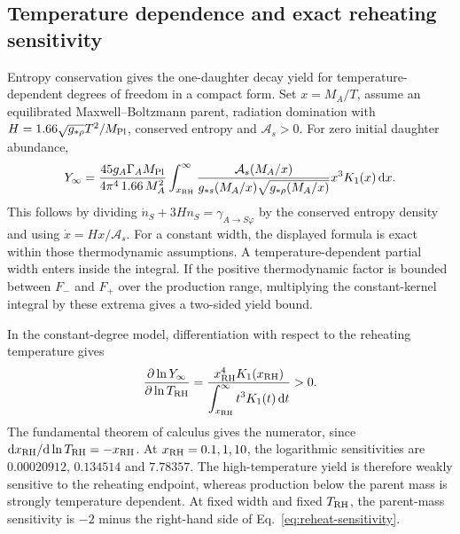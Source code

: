 \subsection{Temperature dependence and exact reheating sensitivity}
Entropy conservation gives the one-daughter decay yield for temperature-dependent degrees of freedom in a compact form. Set $x=M_A/T$, assume an equilibrated Maxwell--Boltzmann parent, radiation domination with $H=1.66\sqrt{g_{*\rho}}T^2/M_{\rm Pl}$, conserved entropy and $\mathcal A_s>0$. For zero initial daughter abundance,
\begin{equation}\label{eq:variable-g-freezein}
Y_\infty=\frac{45g_A\Gamma_AM_{\rm Pl}}{4\pi^4\,1.66\,M_A^2}
\int_{x_{\rm RH}}^\infty
\frac{\mathcal A_s(M_A/x)}{g_{*s}(M_A/x)\sqrt{g_{*\rho}(M_A/x)}}
x^3K_1(x)\,\mathrm{d} x.
\end{equation}
This follows by dividing $\dot n_S+3Hn_S=\gamma_{A\to S\varphi}$ by the conserved entropy density and using $\dot x=Hx/\mathcal A_s$. For a constant width, the displayed formula is exact within those thermodynamic assumptions. A temperature-dependent partial width enters inside the integral. If the positive thermodynamic factor is bounded between $F_-$ and $F_+$ over the production range, multiplying the constant-kernel integral by these extrema gives a two-sided yield bound.

In the constant-degree model, differentiation with respect to the reheating temperature gives
\begin{equation}\label{eq:reheat-sensitivity}
\frac{\partial\ln Y_\infty}{\partial\ln T_{\rm RH}}
=\frac{x_{\rm RH}^4K_1(x_{\rm RH})}
{\displaystyle\int_{x_{\rm RH}}^\infty t^3K_1(t)\,\mathrm{d} t}>0.
\end{equation}
The fundamental theorem of calculus gives the numerator, since $\mathrm{d} x_{\rm RH}/\mathrm{d}\ln T_{\rm RH}=-x_{\rm RH}$. At $x_{\rm RH}=0.1,1,10$, the logarithmic sensitivities are $0.00020912$, $0.134514$ and $7.78357$. The high-temperature yield is therefore weakly sensitive to the reheating endpoint, whereas production below the parent mass is strongly temperature dependent. At fixed width and fixed $T_{\rm RH}$, the parent-mass sensitivity is $-2$ minus the right-hand side of Eq.~\eqref{eq:reheat-sensitivity}.
